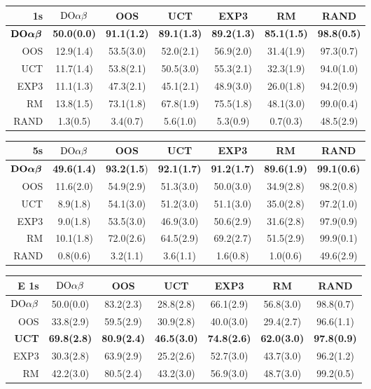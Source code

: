 \begin{table}[t!]
\centering
\begin{scriptsize}
\begin{tabular}{|r|cccccc|}\hline
1s&$\textrm{DO}\alpha\beta$&OOS&UCT&EXP3&RM&RAND\\\hline
$\textrm{\bf DO}\boldsymbol{\alpha\beta}$&\textbf{50.0(0.0)}&\textbf{91.1(1.2)}&\textbf{89.1(1.3)}&\textbf{89.2(1.3)}&\textbf{85.1(1.5)}&\textbf{98.8(0.5)}\\
OOS&12.9(1.4)&53.5(3.0)&52.0(2.1)&56.9(2.0)&31.4(1.9)&97.3(0.7)\\
UCT&11.7(1.4)&53.8(2.1)&50.5(3.0)&55.3(2.1)&32.3(1.9)&94.0(1.0)\\
EXP3&11.1(1.3)&47.3(2.1)&45.1(2.1)&48.9(3.0)&26.0(1.8)&94.2(0.9)\\
RM&13.8(1.5)&73.1(1.8)&67.8(1.9)&75.5(1.8)&48.1(3.0)&99.0(0.4)\\
RAND&1.3(0.5)&3.4(0.7)&5.6(1.0)&5.3(0.9)&0.7(0.3)&48.5(2.9)\\
\hline
\end{tabular}
\begin{tabular}{|r|cccccc|}\hline
5s&$\textrm{DO}\alpha\beta$&OOS&UCT&EXP3&RM&RAND\\\hline
$\textrm{\bf DO}\boldsymbol{\alpha\beta}$&\textbf{49.6(1.4)}&\textbf{93.2(1.5})&\textbf{92.1(1.7)}&\textbf{91.2(1.7)}&\textbf{89.6(1.9)}&\textbf{99.1(0.6)}\\
OOS&11.6(2.0)&54.9(2.9)&51.3(3.0)&50.0(3.0)&34.9(2.8)&98.2(0.8)\\
UCT&8.9(1.8)&54.1(3.0)&51.2(3.0)&51.1(3.0)&35.0(2.8)&97.2(1.0)\\
EXP3&9.0(1.8)&53.5(3.0)&46.9(3.0)&50.6(2.9)&31.6(2.8)&97.9(0.9)\\
RM&10.1(1.8)&72.0(2.6)&64.5(2.9)&69.2(2.7)&51.5(2.9)&99.9(0.1)\\
RAND&0.8(0.6)&3.2(1.1)&3.6(1.1)&1.6(0.8)&1.0(0.6)&49.6(2.9)\\
\hline
\end{tabular}
\begin{tabular}{|r|cccccc|}\hline
E 1s&$\textrm{DO}\alpha\beta$&OOS&UCT&EXP3&RM&RAND\\\hline
$\textrm{DO}\alpha\beta$&50.0(0.0)&83.2(2.3)&28.8(2.8)&66.1(2.9)&56.8(3.0)&98.8(0.7)\\
OOS&33.8(2.9)&59.5(2.9)&30.9(2.8)&40.0(3.0)&29.4(2.7)&96.6(1.1)\\
\textbf{UCT}&\textbf{69.8(2.8)}&\textbf{80.9(2.4)}&\textbf{46.5(3.0)}&\textbf{74.8(2.6)}&\textbf{62.0(3.0)}&\textbf{97.8(0.9)}\\
EXP3&30.3(2.8)&63.9(2.9)&25.2(2.6)&52.7(3.0)&43.7(3.0)&96.2(1.2)\\
RM&42.2(3.0)&80.5(2.4)&43.2(3.0)&56.9(3.0)&48.7(3.0)&99.2(0.5)\\

\end{tabular}
\end{scriptsize}
\end{table}
